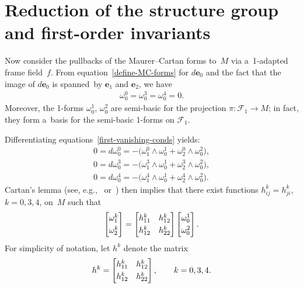 \documentclass[10pt,a4paper]{amsart}
\numberwithin{equation}{section}
\theoremstyle{definition}
\begin{document}
\section{Reduction of the structure group and f\/irst-order invariants}\label{moving-frames-sec}

Now consider the pullbacks of the Maurer--Cartan forms to~$M$ via a~1-adapted frame f\/ield~$f$.
From equation~\eqref{define-MC-forms} for $d\mathbf{e}_0$ and the fact that the image of $d\mathbf{e}_0$ is spanned~by
$\mathbf{e}_1$ and $\mathbf{e}_2$, we have
\begin{gather}
\omega^0_0 = \omega^3_0 = \omega^4_0 = 0.
\label{first-vanishing-conds}
\end{gather}
Moreover, the 1-forms $\omega^1_0$, $\omega^2_0$ are semi-basic for the projection $\pi:\mathcal{F}_1 \to M$; in fact,
they form a~basis for the semi-basic 1-forms on $\mathcal{F}_1$.

Dif\/ferentiating equations~\eqref{first-vanishing-conds} yields:
\begin{gather*}
0 = d\omega^0_0 = -\big(\omega^0_1 \wedge \omega^1_0 + \omega^0_2 \wedge \omega^2_0\big),
\\
0 = d\omega^3_0 = -\big(\omega^3_1 \wedge \omega^1_0 + \omega^3_2 \wedge \omega^2_0\big),
\\
0 = d\omega^4_0 = -\big(\omega^4_1 \wedge \omega^1_0 + \omega^4_2 \wedge \omega^2_0\big).
\end{gather*}
Cartan's lemma (see, e.g.,~\cite{CFB} or~\cite{FTC}) then implies that there exist functions $h^k_{ij} = h^k_{ji}$, $k=0,3,4$, on~$M$ such that
\begin{gather*}
\begin{bmatrix}
\omega^k_1
\vspace{1mm}\\
\omega^k_2
\end{bmatrix}
=
\begin{bmatrix}
h^k_{11} & h^k_{12}
\vspace{1mm}\\
h^k_{12} & h^k_{22}
\end{bmatrix}
\begin{bmatrix}
\omega^1_0
\vspace{1mm}\\
\omega^2_0
\end{bmatrix}.
\end{gather*}
For simplicity of notation, let $h^k$ denote the matrix
\begin{gather*}
h^k =
\begin{bmatrix}
h^k_{11} & h^k_{12}
\vspace{1mm}\\
h^k_{12} & h^k_{22}
\end{bmatrix},
\qquad
k=0,3,4.
\end{gather*}
\end{document}
